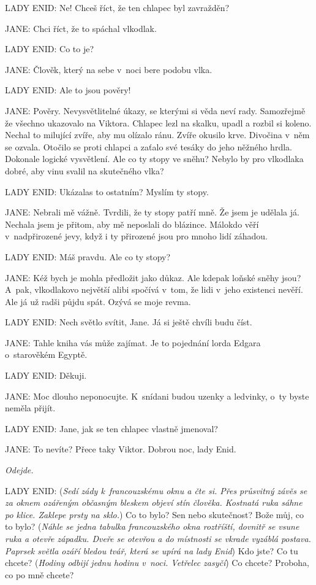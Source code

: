\noindent
LADY ENID: Ne! Chceš říct, že ten chlapec byl zavražděn?

\noindent
JANE: Chci říct, že to spáchal vlkodlak.

\noindent
LADY ENID: Co to je?

\noindent
JANE: Člověk, který na sebe v noci bere podobu vlka.

\noindent
LADY ENID: Ale to jsou pověry!

\noindent
JANE: Pověry. Nevysvětlitelné úkazy, se kterými si věda neví rady. Samozřejmě že všechno ukazovalo na Viktora. Chlapec lezl na skalku, upadl a rozbil si koleno. Nechal to milující zvíře, aby mu olízalo ránu. Zvíře okusilo krve. Divočina v něm se ozvala. Otočilo se proti chlapci a zaťalo své tesáky do jeho něžného hrdla. Dokonale logické vysvětlení. Ale co ty stopy ve sněhu? Nebylo by pro vlkodlaka dobré, aby vinu svalil na skutečného vlka?

\noindent
LADY ENID: Ukázalas to ostatním? Myslím ty stopy.

\noindent
JANE: Nebrali mě vážně. Tvrdili, že ty stopy patří mně. Že jsem je udělala já. Nechala jsem je přitom, aby mě neposlali do blázince. Málokdo věří v nadpřirozené jevy, když i ty přirozené jsou pro mnoho lidí záhadou.

\noindent
LADY ENID: Máš pravdu. Ale co ty stopy?

\noindent
JANE: Kéž bych je mohla předložit jako důkaz. Ale kdepak loňské sněhy jsou? A~pak, vlkodlakovo největší alibi spočívá v tom, že lidi v jeho existenci nevěří. Ale já už radši půjdu spát. Ozývá se moje revma.

\noindent
LADY ENID: Nech světlo svítit, Jane. Já si ještě chvíli budu číst.

\noindent
JANE: Tahle kniha vás může zajímat. Je to pojednání lorda Edgara o~starověkém Egyptě.

\noindent
LADY ENID: Děkuji.

\noindent
JANE: Moc dlouho neponocujte. K snídani budou uzenky a ledvinky, o~ty byste neměla přijít.

\noindent
LADY ENID: Jane, jak se ten chlapec vlastně jmenoval?

\noindent
JANE: To nevíte? Přece taky Viktor. Dobrou noc, lady Enid.

\smallskip

\noindent
\textit{Odejde.}

\smallskip

\noindent
LADY ENID: (\textit{Sedí zády k francouzskému oknu a čte si. Přes průsvitný závěs se za oknem ozářeným občasným bleskem objeví stín člověka. Kostnatá ruka sáhne po klice. Zaklepe prsty na sklo.}) Co to bylo? Sen nebo skutečnost? Bože můj, co to bylo? (\textit{Náhle se jedna tabulka francouzského okna roztříští, dovnitř se vsune ruka a otevře západku. Dveře se otevřou a do místnosti se vkrade vyzáblá postava. Paprsek světla ozáří bledou tvář, která se upírá na lady Enid}) Kdo jste? Co tu chcete? (\textit{Hodiny odbijí jednu hodinu v noci. Vetřelec zasyčí}) Co chcete? Proboha, co po mně chcete?

